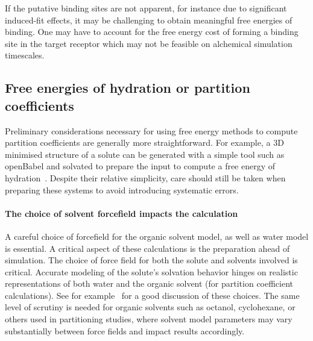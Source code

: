 \documentclass[9pt,bestpractices]{livecoms}
\begin{document}
If the putative binding sites are not apparent, for instance due to significant induced-fit effects, it may be challenging to obtain meaningful free energies of binding. One may have to account for the free energy cost of forming a binding site in the target receptor which may not be feasible on alchemical simulation timescales.

\subsection{Free energies of hydration or partition coefficients}
\label{subsec:hydration}
Preliminary considerations necessary for using free energy methods to compute partition coefficients are generally more straightforward. For example, a 3D minimised structure of a solute can be generated with a simple tool such as openBabel and solvated to prepare the input to compute a free energy of hydration~\cite{oboyle2011open}. Despite their relative simplicity, care should still be taken when preparing these systems to avoid introducing systematic errors.

\paragraph{The choice of solvent forcefield impacts the calculation}
A careful choice of forcefield for the organic solvent model, as well as water model is essential. A critical aspect of these calculations is the preparation ahead of simulation. The choice of force field for both the solute and solvents involved is critical. Accurate modeling of the solute's solvation behavior hinges on realistic representations of both water and the organic solvent (for partition coefficient calculations). See for example~\cite{bosisio2016blinded,rustenburg2016measuring} for a good discussion of these choices.  The same level of scrutiny is needed for organic solvents such as octanol, cyclohexane, or others used in partitioning studies, where solvent model parameters may vary substantially between force fields and impact results accordingly. 
\end{document}
